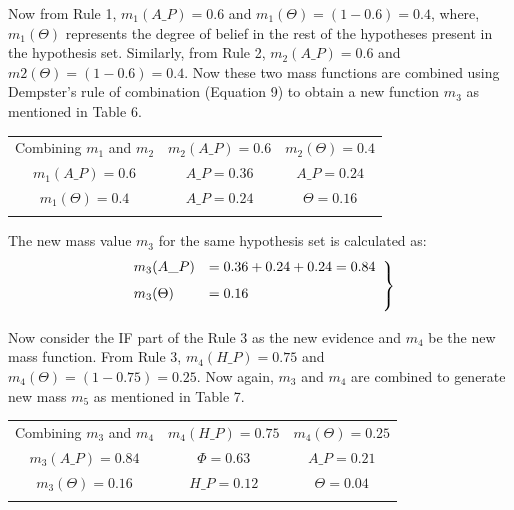 \documentclass{ws-ijufks}
\begin{document}
Now from Rule 1, $m_1(A\_P)=0.6$ and $m_1(\Theta)=(1-0.6)=0.4$, where, $m_1(\Theta)$ represents the degree of belief in 
the rest of the hypotheses present in the hypothesis set. Similarly, from Rule 2, $m_2(A\_P)=0.6$ and 
$m2(\Theta)=(1-0.6)=0.4$. Now these two mass functions are combined using Dempster's rule of combination (Equation 9) 
to obtain a new function $m_3$ as mentioned in Table 6.

\begin{table}[h]
	\label{tab:MCF1}
	{\begin{tabular}{@{}ccc@{}} 
			\toprule
			Combining $m_1$ and $m_2$ & $m_2(A\_P)=0.6$ & $m_2(\Theta)=0.4$\\
			\colrule
			$m_1(A\_P)=0.6$ & $A\_P=0.36$ & $ A\_P=0.24$\\
			$m_1(\Theta)=0.4$ & $A\_P=0.24$ & $\Theta=0.16$\\
			\botrule
		\end{tabular}}
	\end{table}
	
The new mass value $m_3$ for the same hypothesis set is calculated as:
\begin{equation}
\begin{aligned}
\left. \begin{array}{ll}
\vspace{0.25cm}
m_3 (A\_P)&={0.36+0.24+0.24}=0.84\\
\vspace{0.25cm}
m_3(\Theta)&=0.16
\end{array}\right\}
\end {aligned}
\end{equation}

Now consider the IF part of the Rule 3 as the new evidence and $m_4$ be the new mass function. From Rule 3, 
$m_4(H\_P)=0.75$ and $m_4(\Theta)=(1-0.75)=0.25$. Now again, $m_3$ and $m_4$ are combined to generate new mass $m_5$ as 
mentioned in Table 7. 

\begin{table}[h]
	\label{tab:MCF2}
	{\begin{tabular}{@{}ccc@{}} 
			\toprule
		Combining $m_3$ and $m_4$ & $m_4(H\_P)=0.75$ & $m_4(\Theta)=0.25$\\
			\colrule
			$m_3(A\_P)=0.84$ & $\Phi=0.63$ & $A\_P=0.21$\\
			$m_3(\Theta)=0.16$ & $H\_P=0.12$ & $\Theta=0.04$\\
			\botrule
		\end{tabular}}
	\end{table}
\end{document}
